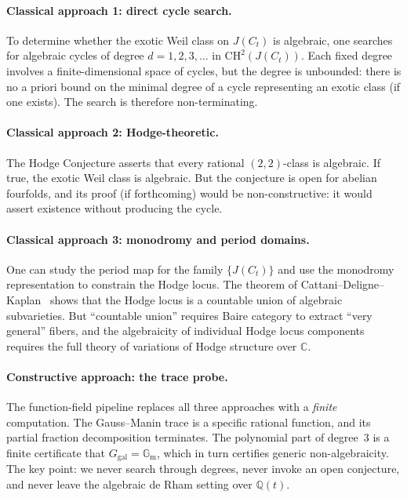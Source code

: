 \documentclass[11pt]{article}
\theoremstyle{plain}
\theoremstyle{definition}
\theoremstyle{remark}
\newcommand{\Q}{\mathbb{Q}}
\newcommand{\C}{\mathbb{C}}
\newcommand{\Ggal}{G_{\mathrm{gal}}}
\newcommand{\Gm}{\mathbb{G}_{\mathrm{m}}}
\begin{document}
\paragraph{Classical approach 1: direct cycle search.}
To determine whether the exotic Weil class on $J(C_t)$ is algebraic,
one searches for algebraic cycles of degree $d = 1, 2, 3, \ldots$
in $\mathrm{CH}^2(J(C_t))$. Each fixed degree involves a finite-dimensional
space of cycles, but the degree is unbounded: there is no a priori bound
on the minimal degree of a cycle representing an exotic class (if one exists).
The search is therefore non-terminating.

\paragraph{Classical approach 2: Hodge-theoretic.}
The Hodge Conjecture asserts that every rational $(2,2)$-class is algebraic.
If true, the exotic Weil class is algebraic. But the conjecture is open
for abelian fourfolds, and its proof (if forthcoming) would be non-constructive:
it would assert existence without producing the cycle.

\paragraph{Classical approach 3: monodromy and period domains.}
One can study the period map for the family $\{J(C_t)\}$ and use the
monodromy representation to constrain the Hodge locus. The theorem of
Cattani--Deligne--Kaplan~\cite{CDK1995} shows that the Hodge locus is
a countable union of algebraic subvarieties. But ``countable union'' requires Baire category
to extract ``very general'' fibers, and the algebraicity of individual
Hodge locus components requires the full theory of variations of Hodge
structure over $\C$.

\paragraph{Constructive approach: the trace probe.}
The function-field pipeline replaces all three approaches with a \emph{finite}
computation. The Gauss--Manin trace is a specific rational function, and
its partial fraction decomposition terminates. The polynomial part
of degree~3 is a finite certificate that $\Ggal = \Gm$, which in turn
certifies generic non-algebraicity. The key point: we never search
through degrees, never invoke an open conjecture, and never leave
the algebraic de Rham setting over $\Q(t)$.
\end{document}
